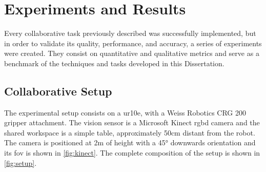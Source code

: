 \chapter{Experiments and Results}
\label{chp:6-tests}

\par Every collaborative task previously described was successfully implemented, but in order to validate its quality, performance, and accuracy, a series of experiments were created. They consist on quantitative and qualitative metrics and serve as a benchmark of the techniques and tasks developed in this Dissertation.





\section{Collaborative Setup}

\par The experimental setup consists on a \ac{ur10e}, with a Weiss Robotics CRG 200 gripper attachment. The vision sensor is a Microsoft Kinect \acs{rgbd} camera and the shared workspace is a simple table, approximately 50cm distant from the robot. The camera is positioned at 2m of height with a \ang{45} downwards orientation and its \ac{fov} is shown in \autoref{fig:kinect}. The complete composition of the setup is shown in \autoref{fig:setup}.

